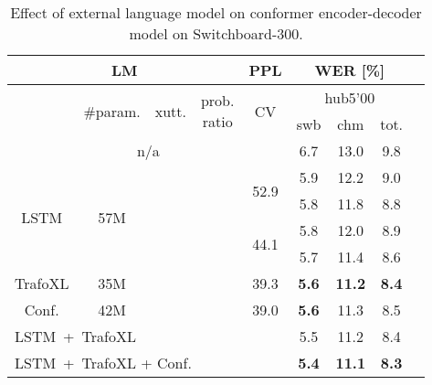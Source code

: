 \documentclass[a4paper]{article}
\begin{document}
\begin{table}
  \eightpt
  \centering
  \caption{Effect of external language model on conformer encoder-decoder model on Switchboard-300.}
  \vspace{-3.5mm}
  \begin{tabular}{|@{}c@{}|@{}c@{}|@{}c@{}|@{}c@{}|@{}c@{}|c|c|c|c|}
    \hline
 \multicolumn{4}{|c|}{LM}      &  PPL & \multicolumn{3}{c|}{WER [\%]}     \\ \hline
         & \multirow{2}{*}{\#param.} &  \multirow{2}{*}{xutt.} &  \multirow{2}{*}{\parbox{6mm}{prob.\\ratio}} & \multirow{2}{*}{CV}  & \multicolumn{3}{c|}{hub5'00} \\ \cline{6-8}
\hspace{12mm} & \hspace{11mm} & \hspace{7mm} & \hspace{8mm} & \hspace{8mm} &  swb    &    chm     & tot.   \\
\hline
\hline
         \multicolumn{5}{|c|}{n/a}             & 6.7      & 13.0       & 9.8  \\
\hline                                           
\hline
\multirow{4}{*}{LSTM}  &  \multirow{4}{*}{57M} &              &              & \multirow{2}{*}{52.9} & 5.9      & 12.2    & 9.0   \\ \cline{4-4}\cline{6-8}
         &           &              &  &      & 5.8      & 11.8    & 8.8   \\ \cline{3-5}\cline{6-8}
         &           & \multirow{4}{*}{} &              & \multirow{2}{*}{44.1} & 5.8      & 12.0    & 8.9   \\
         \cline{4-4}\cline{6-8}
         &           &              & \multirow{3}{*}{} &      & 5.7      & 11.4    & 8.6   \\  \cline{1-2}\cline{5-8}
TrafoXL &  35M      &              &              & 39.3 & \bf 5.6      & \bf 11.2    & \bf 8.4   \\ \cline{1-2}\cline{5-8}
Conf.    &  42M      &              &              & 39.0 & \bf 5.6      & 11.3    & 8.5   \\
\hline
\hline
\multicolumn{5}{|l|}{LSTM\ +\ TrafoXL}                   & 5.5      & 11.2    & 8.4   \\ \cline{1-8}
\multicolumn{5}{|l|}{LSTM\ +\ TrafoXL + Conf.}           & \bf 5.4      & \bf 11.1    & \bf 8.3   \\
\hline
\end{tabular}                              
\label{tab:lm1}
\vspace{-5mm}
\end{table}
\end{document}
